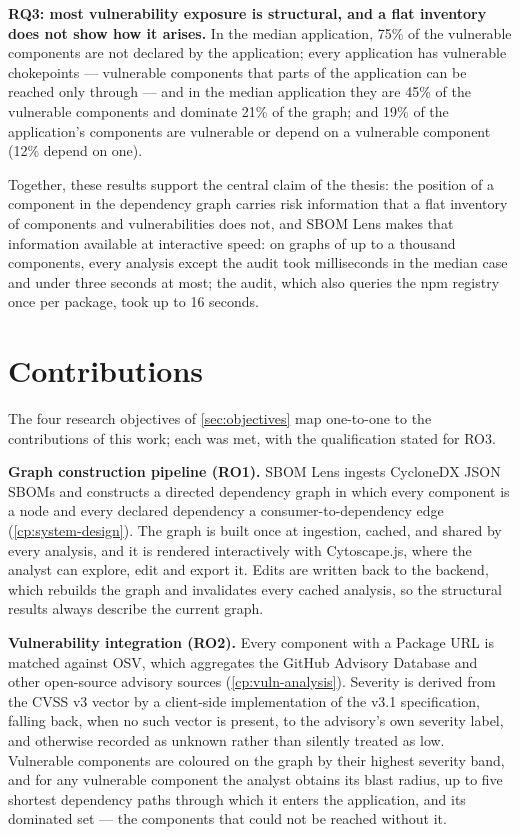\textbf{RQ3: most vulnerability exposure is structural, and a flat inventory does not show how it arises.} In the median application, 75\% of the vulnerable components are not declared by the application; every application has vulnerable chokepoints --- vulnerable components that parts of the application can be reached only through --- and in the median application they are 45\% of the vulnerable components and dominate 21\% of the graph; and 19\% of the application's components are vulnerable or depend on a vulnerable component (12\% depend on one).

Together, these results support the central claim of the thesis: the position of a component in the dependency graph carries risk information that a flat inventory of components and vulnerabilities does not, and SBOM Lens makes that information available at interactive speed: on graphs of up to a thousand components, every analysis except the audit took milliseconds in the median case and under three seconds at most; the audit, which also queries the npm registry once per package, took up to 16 seconds.


\section{Contributions}
\label{sec:concl-contributions}

The four research objectives of \autoref{sec:objectives} map one-to-one to the contributions of this work; each was met, with the qualification stated for RO3.

\textbf{Graph construction pipeline (RO1).} SBOM Lens ingests CycloneDX JSON SBOMs and constructs a directed dependency graph in which every component is a node and every declared dependency a consumer-to-dependency edge (\autoref{cp:system-design}). The graph is built once at ingestion, cached, and shared by every analysis, and it is rendered interactively with Cytoscape.js, where the analyst can explore, edit and export it. Edits are written back to the backend, which rebuilds the graph and invalidates every cached analysis, so the structural results always describe the current graph.

\textbf{Vulnerability integration (RO2).} Every component with a Package URL is matched against OSV, which aggregates the GitHub Advisory Database and other open-source advisory sources (\autoref{cp:vuln-analysis}). Severity is derived from the CVSS v3 vector by a client-side implementation of the v3.1 specification, falling back, when no such vector is present, to the advisory's own severity label, and otherwise recorded as unknown rather than silently treated as low. Vulnerable components are coloured on the graph by their highest severity band, and for any vulnerable component the analyst obtains its blast radius, up to five shortest dependency paths through which it enters the application, and its dominated set --- the components that could not be reached without it.

